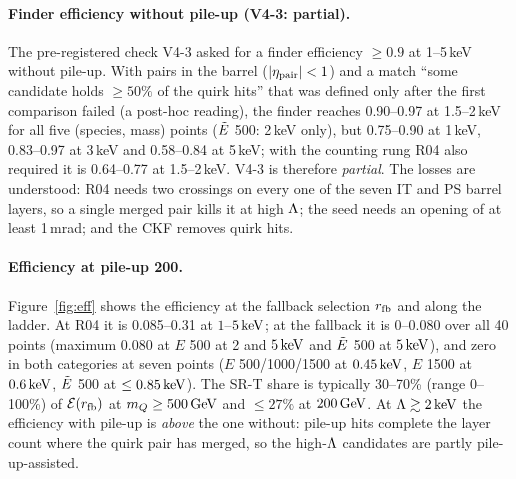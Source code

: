 \paragraph{Finder efficiency without pile-up (V4-3: partial).} The pre-registered check V4-3 asked for a finder efficiency
$\ge0.9$ at 1--5\,keV without pile-up. With pairs in the barrel ($|\eta_{\rm pair}|<1$) and a match ``some candidate holds
$\ge50\%$ of the quirk hits'' that was defined only after the first comparison failed (a post-hoc reading), the finder
reaches 0.90--0.97 at 1.5--2\,keV for all five (species, mass) points ($\tilde{E}$ 500: 2\,keV only), but 0.75--0.90 at 1\,keV, 0.83--0.97 at 3\,keV and
0.58--0.84 at 5\,keV; with the counting rung R04 also required it is 0.64--0.77 at 1.5--2\,keV. V4-3 is therefore
\emph{partial}. The losses are understood: R04 needs two crossings on every one of the seven IT and PS barrel layers, so a
single merged pair kills it at high $\Lambda$; the seed needs an opening of at least 1\,mrad; and the CKF removes quirk hits.

\paragraph{Efficiency at pile-up 200.} Figure~\ref{fig:eff} shows the efficiency at the fallback selection $r_{\rm fb}$
and along the ladder. At R04 it is 0.085--0.31 at $1$--$5\,\mathrm{keV}$; at the fallback it is 0--0.080 over all 40 points (maximum
0.080 at $E$ 500 at 2 and $5\,\mathrm{keV}$ and $\tilde{E}$ 500 at $5\,\mathrm{keV}$), and zero in both categories at seven points ($E$
500/1000/1500 at $0.45\,\mathrm{keV}$, $E$ 1500 at $0.6\,\mathrm{keV}$, $\tilde{E}$ 500 at $\le0.85\,\mathrm{keV}$). The SR-T share is typically 30--70\% (range 0--100\%) of
$\mathcal{E}(r_{\rm fb})$ at $m_Q\ge500\,\mathrm{GeV}$ and $\le27\%$ at $200\,\mathrm{GeV}$. At $\Lambda\gtrsim2\,\mathrm{keV}$ the efficiency with pile-up is
\emph{above} the one without: pile-up hits complete the layer count where the quirk pair has merged, so the high-$\Lambda$
candidates are partly pile-up-assisted.

